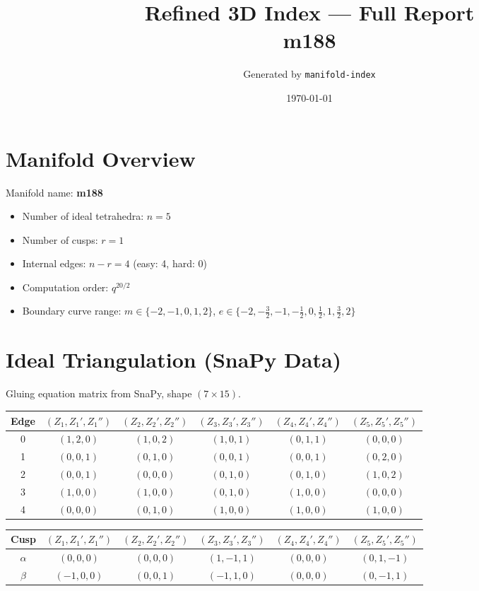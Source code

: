 \documentclass[11pt,a4paper]{article}
\begin{document}
\title{Refined 3D Index — Full Report \\ \large m188}
\author{Generated by \texttt{manifold-index}}
\date{\today}
\maketitle
\tableofcontents
\newpage

\section{Manifold Overview}
Manifold name: \textbf{m188}

\begin{itemize}
  \item Number of ideal tetrahedra: $n = 5$
  \item Number of cusps: $r = 1$
  \item Internal edges: $n - r = 4$ (easy: 4, hard: 0)
  \item Computation order: $q^{20/2}$
  \item Boundary curve range: $m \in \{-2, -1, 0, 1, 2\}$, $e \in \{-2, -\tfrac{3}{2}, -1, -\tfrac{1}{2}, 0, \tfrac{1}{2}, 1, \tfrac{3}{2}, 2\}$
\end{itemize}

\section{Ideal Triangulation (SnaPy Data)}
Gluing equation matrix from SnaPy, shape $(7 \times 15)$.

\begin{longtable}{c c c c c c}
\toprule
Edge & $(Z_{1}, Z_{1}', Z_{1}'')$ & $(Z_{2}, Z_{2}', Z_{2}'')$ & $(Z_{3}, Z_{3}', Z_{3}'')$ & $(Z_{4}, Z_{4}', Z_{4}'')$ & $(Z_{5}, Z_{5}', Z_{5}'')$ \\ \midrule
\endhead
0 & $(1, 2, 0)$ & $(1, 0, 2)$ & $(1, 0, 1)$ & $(0, 1, 1)$ & $(0, 0, 0)$ \\
1 & $(0, 0, 1)$ & $(0, 1, 0)$ & $(0, 0, 1)$ & $(0, 0, 1)$ & $(0, 2, 0)$ \\
2 & $(0, 0, 1)$ & $(0, 0, 0)$ & $(0, 1, 0)$ & $(0, 1, 0)$ & $(1, 0, 2)$ \\
3 & $(1, 0, 0)$ & $(1, 0, 0)$ & $(0, 1, 0)$ & $(1, 0, 0)$ & $(0, 0, 0)$ \\
4 & $(0, 0, 0)$ & $(0, 1, 0)$ & $(1, 0, 0)$ & $(1, 0, 0)$ & $(1, 0, 0)$ \\
\bottomrule
\end{longtable}

\begin{longtable}{c c c c c c}
\toprule
Cusp & $(Z_{1}, Z_{1}', Z_{1}'')$ & $(Z_{2}, Z_{2}', Z_{2}'')$ & $(Z_{3}, Z_{3}', Z_{3}'')$ & $(Z_{4}, Z_{4}', Z_{4}'')$ & $(Z_{5}, Z_{5}', Z_{5}'')$ \\ \midrule
\endhead
$\alpha$ & $(0, 0, 0)$ & $(0, 0, 0)$ & $(1, -1, 1)$ & $(0, 0, 0)$ & $(0, 1, -1)$ \\
$\beta$ & $(-1, 0, 0)$ & $(0, 0, 1)$ & $(-1, 1, 0)$ & $(0, 0, 0)$ & $(0, -1, 1)$ \\
\bottomrule
\end{longtable}
\end{document}
